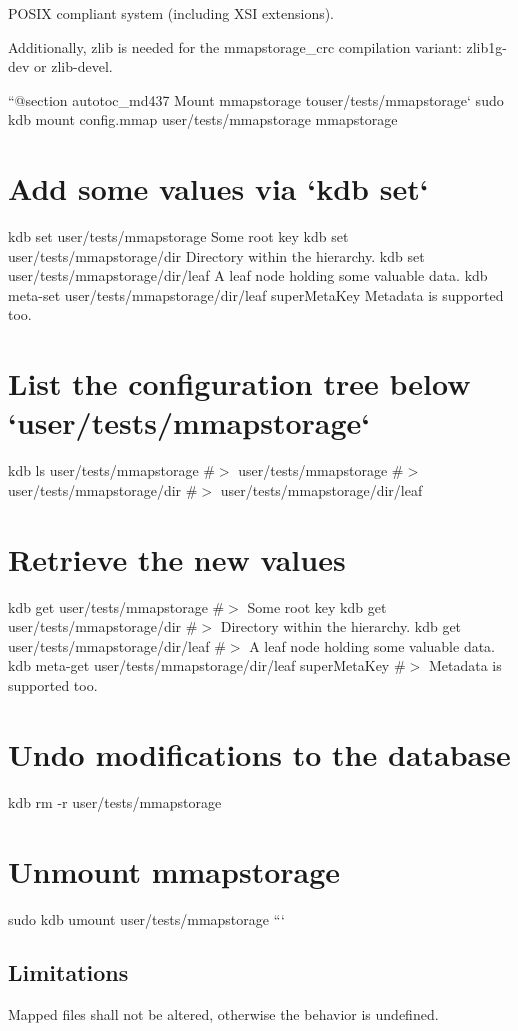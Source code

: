 P\+O\+S\+IX compliant system (including X\+SI extensions).

Additionally, zlib is needed for the {\ttfamily mmapstorage\+\_\+crc} compilation variant\+: {\ttfamily zlib1g-\/dev} or {\ttfamily zlib-\/devel}.

``{\ttfamily  @section autotoc\+\_\+md437 Mount mmapstorage to}user/tests/mmapstorage` sudo kdb mount config.\+mmap user/tests/mmapstorage mmapstorage\hypertarget{autotoc_md431_autotoc_md438}{}\section{Add some values via `kdb set`}\label{autotoc_md431_autotoc_md438}
kdb set user/tests/mmapstorage \textquotesingle{}Some root key\textquotesingle{} kdb set user/tests/mmapstorage/dir \textquotesingle{}Directory within the hierarchy.\textquotesingle{} kdb set user/tests/mmapstorage/dir/leaf \textquotesingle{}A leaf node holding some valuable data.\textquotesingle{} kdb meta-\/set user/tests/mmapstorage/dir/leaf super\+Meta\+Key \textquotesingle{}Metadata is supported too.\textquotesingle{}\hypertarget{autotoc_md431_autotoc_md439}{}\section{List the configuration tree below `user/tests/mmapstorage`}\label{autotoc_md431_autotoc_md439}
kdb ls user/tests/mmapstorage \#$>$ user/tests/mmapstorage \#$>$ user/tests/mmapstorage/dir \#$>$ user/tests/mmapstorage/dir/leaf\hypertarget{autotoc_md431_autotoc_md440}{}\section{Retrieve the new values}\label{autotoc_md431_autotoc_md440}
kdb get user/tests/mmapstorage \#$>$ Some root key kdb get user/tests/mmapstorage/dir \#$>$ Directory within the hierarchy. kdb get user/tests/mmapstorage/dir/leaf \#$>$ A leaf node holding some valuable data. kdb meta-\/get user/tests/mmapstorage/dir/leaf super\+Meta\+Key \#$>$ Metadata is supported too.\hypertarget{autotoc_md431_autotoc_md441}{}\section{Undo modifications to the database}\label{autotoc_md431_autotoc_md441}
kdb rm -\/r user/tests/mmapstorage\hypertarget{autotoc_md431_autotoc_md442}{}\section{Unmount mmapstorage}\label{autotoc_md431_autotoc_md442}
sudo kdb umount user/tests/mmapstorage ```\hypertarget{autotoc_md431_autotoc_md443}{}\subsection{Limitations}\label{autotoc_md431_autotoc_md443}
Mapped files shall not be altered, otherwise the behavior is undefined.

